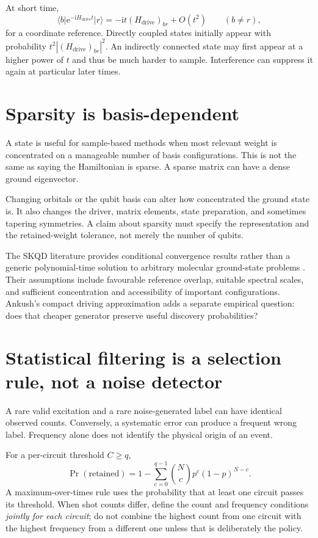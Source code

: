 \documentclass[11pt,a4paper,oneside]{report}
\newcommand{\ket}[1]{\lvert #1\rangle}
\newcommand{\bra}[1]{\langle #1\rvert}
\newcommand{\abs}[1]{\left\lvert #1\right\rvert}
\newcommand{\Hd}{H_{\mathrm{drive}}}
\newcommand{\I}{\mathrm i}
\newcommand{\e}{\mathrm e}
\begin{document}
At short time,
\begin{equation}
\bra b\e^{-\I\Hd t}\ket r=-\I t(\Hd)_{br}+O(t^2)\qquad(b\ne r),
\end{equation}
for a coordinate reference. Directly coupled states initially appear with probability $t^2\abs{(\Hd)_{br}}^2$. An indirectly connected state may first appear at a higher power of $t$ and thus be much harder to sample. Interference can suppress it again at particular later times.

\section{Sparsity is basis-dependent}
A state is useful for sample-based methods when most relevant weight is concentrated on a manageable number of basis configurations. This is not the same as saying the Hamiltonian is sparse. A sparse matrix can have a dense ground eigenvector.

Changing orbitals or the qubit basis can alter how concentrated the ground state is. It also changes the driver, matrix elements, state preparation, and sometimes tapering symmetries. A claim about sparsity must specify the representation and the retained-weight tolerance, not merely the number of qubits.

The SKQD literature provides conditional convergence results rather than a generic polynomial-time solution to arbitrary molecular ground-state problems \cite{yu}. Their assumptions include favourable reference overlap, suitable spectral scales, and sufficient concentration and accessibility of important configurations. Ankush's compact driving approximation adds a separate empirical question: does that cheaper generator preserve useful discovery probabilities?

\section{Statistical filtering is a selection rule, not a noise detector}
A rare valid excitation and a rare noise-generated label can have identical observed counts. Conversely, a systematic error can produce a frequent wrong label. Frequency alone does not identify the physical origin of an event.

For a per-circuit threshold $C\ge q$,
\begin{equation}
\Pr(\text{retained})=1-\sum_{c=0}^{q-1}\binom Nc p^c(1-p)^{N-c}.
\end{equation}
A maximum-over-times rule uses the probability that at least one circuit passes its threshold. When shot counts differ, define the count and frequency conditions \emph{jointly for each circuit}; do not combine the highest count from one circuit with the highest frequency from a different one unless that is deliberately the policy.
\end{document}
